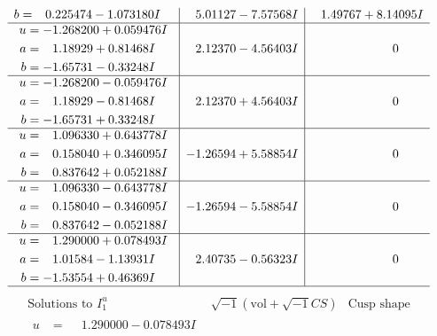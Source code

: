 \documentclass[1p]{elsarticle_modified}
\theoremstyle{definition}
\newcommand{\I}{\sqrt{-1}}
\begin{document}
$$\begin{array}{c|c|c}
\begin{aligned}
b &= \phantom{-}0.225474 - 1.073180 I\end{aligned}
 & \phantom{-}5.01127 - 7.57568 I & \phantom{-}1.49767 + 8.14095 I \\ \hline\begin{aligned}
u &= -1.268200 + 0.059476 I \\
a &= \phantom{-}1.18929 + 0.81468 I \\
b &= -1.65731 - 0.33248 I\end{aligned}
 & \phantom{-}2.12370 - 4.56403 I & \phantom{-0.000000 } 0 \\ \hline\begin{aligned}
u &= -1.268200 - 0.059476 I \\
a &= \phantom{-}1.18929 - 0.81468 I \\
b &= -1.65731 + 0.33248 I\end{aligned}
 & \phantom{-}2.12370 + 4.56403 I & \phantom{-0.000000 } 0 \\ \hline\begin{aligned}
u &= \phantom{-}1.096330 + 0.643778 I \\
a &= \phantom{-}0.158040 + 0.346095 I \\
b &= \phantom{-}0.837642 + 0.052188 I\end{aligned}
 & -1.26594 + 5.58854 I & \phantom{-0.000000 } 0 \\ \hline\begin{aligned}
u &= \phantom{-}1.096330 - 0.643778 I \\
a &= \phantom{-}0.158040 - 0.346095 I \\
b &= \phantom{-}0.837642 - 0.052188 I\end{aligned}
 & -1.26594 - 5.58854 I & \phantom{-0.000000 } 0 \\ \hline\begin{aligned}
u &= \phantom{-}1.290000 + 0.078493 I \\
a &= \phantom{-}1.01584 - 1.13931 I \\
b &= -1.53554 + 0.46369 I\end{aligned}
 & \phantom{-}2.40735 - 0.56323 I & \phantom{-0.000000 } 0\\
 \hline 
 \end{array}$$\newpage$$\begin{array}{c|c|c}  
\text{Solutions to }I^u_{1}& \I (\text{vol} + \sqrt{-1}CS) & \text{Cusp shape}\\
 \hline 
\begin{aligned}
u &= \phantom{-}1.290000 - 0.078493 I \\

\end{aligned}
\end{array}$$
\end{document}
